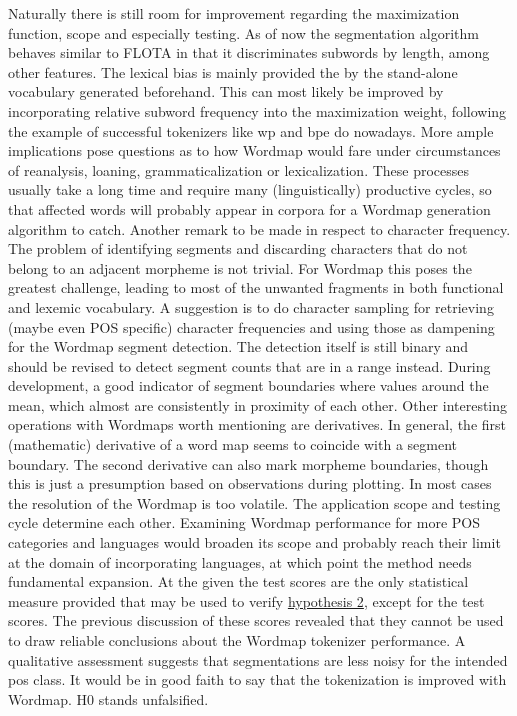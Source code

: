 Naturally there is still room for improvement regarding the maximization function, scope and especially testing.
As of now the segmentation algorithm behaves similar to FLOTA in that it discriminates subwords by length, among other features.
The lexical bias is mainly provided the by the stand-alone vocabulary generated beforehand.
This can most likely be improved by incorporating relative subword frequency into the maximization weight, following the example of successful tokenizers like \ac{wp} and \ac{bpe} do nowadays.
More ample implications pose questions as to how Wordmap would fare under circumstances of reanalysis, loaning, grammaticalization or lexicalization.
These processes usually take a long time and require many (linguistically) productive cycles, so that affected words will probably appear in corpora for a Wordmap generation algorithm to catch.
Another remark to be made in respect to character frequency.
The problem of identifying segments and discarding characters that do not belong to an adjacent morpheme is not trivial.
For Wordmap this poses the greatest challenge, leading to most of the unwanted fragments in both functional and lexemic vocabulary.
A suggestion is to do character sampling for retrieving (maybe even POS specific) character frequencies and using those as dampening for the Wordmap segment detection.
The detection itself is still binary and should be revised to detect segment counts that are in a range instead.
During development, a good indicator of segment boundaries where values around the mean, which almost are consistently in proximity of each other.
Other interesting operations with Wordmaps worth mentioning are derivatives.
In general, the first (mathematic) derivative of a word map seems to coincide with a segment boundary.
The second derivative can also mark morpheme boundaries, though this is just a presumption based on observations during plotting.
In most cases the resolution of the Wordmap is too volatile.
The application scope and testing cycle determine each other.
Examining Wordmap performance for more POS categories and languages would broaden its scope and probably reach their limit at the domain of incorporating languages, at which point the method needs fundamental expansion.
At the given the test scores are the only statistical measure provided that may be used to verify \hyperlink{hyp2}{hypothesis 2}, except for the test scores.
The previous discussion of these scores revealed that they cannot be used to draw reliable conclusions about the Wordmap tokenizer performance.
A qualitative assessment suggests that segmentations are less noisy for the intended \ac{pos} class.
It would be in good faith to say that the tokenization is improved with Wordmap.
H0 stands unfalsified.

